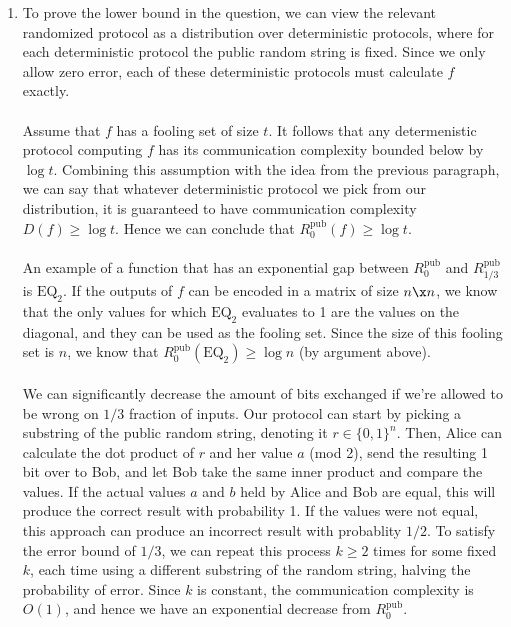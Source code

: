 \documentclass{article}
\begin{document}
\begin{enumerate}

    \item To prove the lower bound in the question, we can view the relevant
        randomized protocol as a distribution over deterministic protocols,
        where for each deterministic protocol the public random string is
        fixed. Since we only allow zero error, each of these deterministic
        protocols must calculate $f$ exactly.
        \\\\
        Assume that $f$ has a fooling set of size $t$. It follows that any
        determenistic protocol computing $f$ has its communication complexity
        bounded below by $\log t$. Combining this assumption with the
        idea from the previous paragraph, we can say that whatever
        deterministic protocol we pick from our distribution, it is guaranteed
        to have communication complexity $D(f) \geq \log t$. Hence we
        can conclude that $R^{\textrm{pub}}_0(f) \geq \log t$.
        \\\\
        An example of a function that has an exponential gap between
        $R^{\textrm{pub}}_0$ and $R^{\textrm{pub}}_{1/3}$ is $\textrm{EQ}_2$.
        If the outputs of $f$ can be encoded in a matrix of size $n \x n$, we
        know that the only values for which $\textrm{EQ}_2$ evaluates to 1 are
        the values on the diagonal, and they can be used as the fooling set.
        Since the size of this fooling set is $n$, we know that
        $R^{\textrm{pub}}_0(\textrm{EQ}_2) \geq \log n$ (by argument above).
        \\\\
        We can significantly decrease the amount of bits exchanged if we're
        allowed to be wrong on $1/3$ fraction of inputs. Our protocol can start
        by picking a substring of the public random string, denoting it $r \in
        \{ 0, 1 \}^n$.  Then, Alice can calculate the dot product of $r$ and
        her value $a$ (mod 2), send the resulting 1 bit over to Bob, and let
        Bob take the same inner product and compare the values. If the actual
        values $a$ and $b$ held by Alice and Bob are equal, this will produce
        the correct result with probability 1. If the values were not equal,
        this approach can produce an incorrect result with probablity $1/2$. To
        satisfy the error bound of $1/3$, we can repeat this process $k \geq 2$
        times for some fixed $k$, each time using a different substring of the
        random string, halving the probability of error. Since $k$ is constant,
        the communication complexity is $O(1)$, and hence we have an
        exponential decrease from $R^{\textrm{pub}}_0$.
        \\


\end{enumerate}
\end{document}
